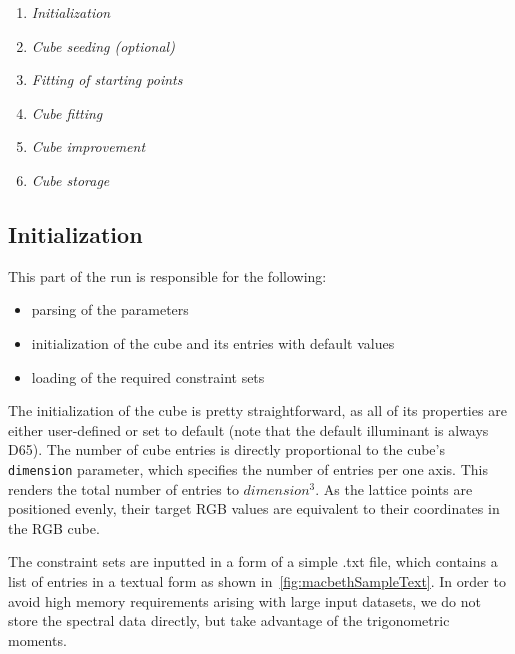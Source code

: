 \begin{enumerate}
	\item \emph{Initialization}
	\item \emph{Cube seeding (optional)}
	\item \emph{Fitting of starting points}
	\item \emph{Cube fitting}
	\item \emph{Cube improvement}
	\item \emph{Cube storage}
\end{enumerate}

\subsection{Initialization} \label{ssec:initialization}

This part of the run is responsible for the following:
\begin{itemize}
	\item parsing of the parameters
	\item initialization of the cube and its entries with default values
	\item loading of the required constraint sets
\end{itemize}

The initialization of the cube is pretty straightforward, as all of its properties are either user-defined or set to default (note that the default illuminant is always D65). The number of cube entries is directly proportional to the cube's \texttt{dimension} parameter, which specifies the number of entries per one axis. This renders the total number of entries to $dimension^3$. As the lattice points are positioned evenly, their target RGB values are equivalent to their coordinates in the RGB cube.

The constraint sets are inputted in a form of a simple .txt file, which contains a list of entries in a textual form as shown in~\cref{fig:macbethSampleText}. In order to avoid high memory requirements arising with large input datasets, we do not store the spectral data directly, but take advantage of the trigonometric moments.

